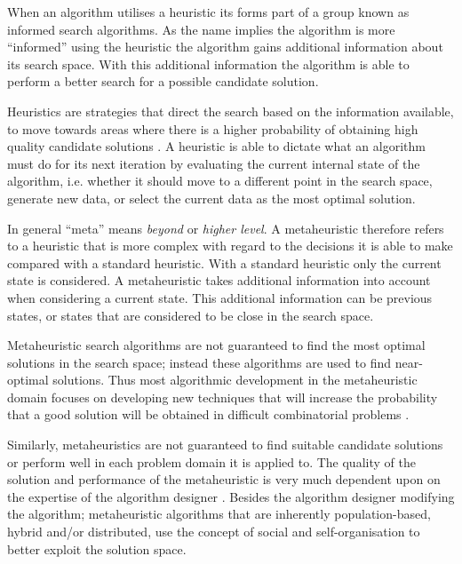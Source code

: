 When an algorithm utilises a heuristic its forms part of a group known as informed search algorithms. As the name implies the algorithm is more ``informed'' using the heuristic the algorithm gains additional information about its search space. With this additional information the algorithm is able to perform a better search for a possible candidate solution\cite{AIModernApproach}.

Heuristics are strategies that direct the search based on the information available, to move towards areas where there is a higher probability of obtaining high quality candidate solutions \cite{AIModernApproach}. A heuristic is able to dictate what an algorithm must do for its next iteration by evaluating the current internal state of the algorithm, i.e. whether it should move to a different point in the search space, generate new data, or select the current data as the most optimal solution\cite{AIModernApproach,NatureInspiredMetaHeuristic}. 

In general ``meta'' means \emph{beyond} or \emph{higher level}\cite{AIModernApproach,NatureInspiredMetaHeuristic}. A metaheuristic therefore refers to a heuristic that is more complex with regard to the decisions it is able to make compared with a standard heuristic\cite{AIModernApproach,NatureInspiredMetaHeuristic}. With a standard heuristic only the current state is considered\cite{AIModernApproach}. A metaheuristic takes additional information into account when considering a current state\cite{NatureInspiredMetaHeuristic}. This additional information can be previous states, or states that are considered to be close in the search space\cite{AIModernApproach, NatureInspiredMetaHeuristic}.

Metaheuristic search algorithms are not guaranteed to find the most optimal solutions in the search space; instead these algorithms are used to find near-optimal solutions. Thus most algorithmic development in the metaheuristic domain focuses on developing new techniques that will increase the probability that a good solution will be obtained in difficult combinatorial problems \cite{MetaAgricultural}.

Similarly, metaheuristics are not guaranteed to find suitable candidate solutions or perform well in each problem domain it is applied to. The quality of the solution and performance of the metaheuristic is very much dependent upon on the expertise of the algorithm designer \cite{AutoComplexMeta}. Besides the algorithm designer modifying the algorithm; metaheuristic algorithms that are inherently population-based, hybrid and/or distributed, use the concept of social and self-organisation to better exploit the solution space\cite{Self-AdaptiveMeta}.

